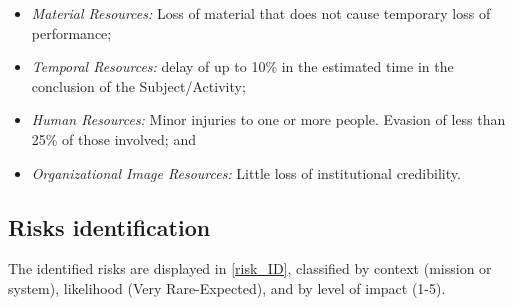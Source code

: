 \begin{itemize}
\begin{itemize}
         \item  \textit{Material Resources:} Loss of material that does not cause temporary loss of performance;
         \item  \textit{Temporal Resources:} delay of up to 10\% in the estimated time in the conclusion of the Subject/Activity;
         \item  \textit{Human Resources:} Minor injuries to one or more people. Evasion of less than 25\% of those involved; and
         \item  \textit{Organizational Image Resources:} Little loss of institutional credibility.
    \end{itemize}
\end{itemize}

\subsection{Risks identification}

The identified risks are displayed in \autoref{risk_ID}, classified by context (mission or system), likelihood (Very Rare-Expected), and by level of impact (1-5).

